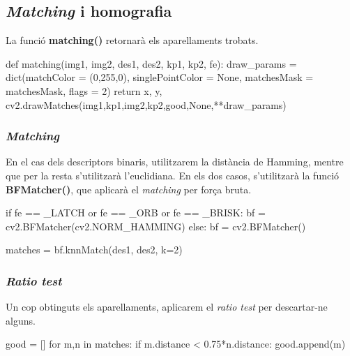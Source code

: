 \newpage
	\subsection{\textit{Matching} i homografia}
La funció \textbf{matching()} retornarà els aparellaments trobats.\\
		\begin{python}
def matching(img1, img2, des1, des2, kp1, kp2, fe):
	draw_params = dict(matchColor = (0,255,0), singlePointColor = None,
					matchesMask = matchesMask, flags = 2)
	return x, y, cv2.drawMatches(img1,kp1,img2,kp2,good,None,**draw_params)
		\end{python}

		\subsubsection{\textit{Matching}}
		En el cas dels descriptors binaris, utilitzarem la distància de Hamming, mentre que per la resta s'utilitzarà l'euclidiana. En els dos casos, s'utilitzarà la funció \textbf{BFMatcher()}, que aplicarà el
		\textit{matching} per força bruta.\\
		\begin{python}
	if fe == _LATCH or fe == _ORB or fe == _BRISK:
		bf = cv2.BFMatcher(cv2.NORM_HAMMING)
	else:
		bf = cv2.BFMatcher()

	matches = bf.knnMatch(des1, des2, k=2)
		\end{python}

		\subsubsection{\textit{Ratio test}}
Un cop obtinguts els aparellaments, aplicarem el \textit{ratio test} per descartar-ne alguns.\\
		\begin{python}
	good = []
	for m,n in matches:
		if m.distance < 0.75*n.distance:
			good.append(m)
		\end{python}

\newpage
